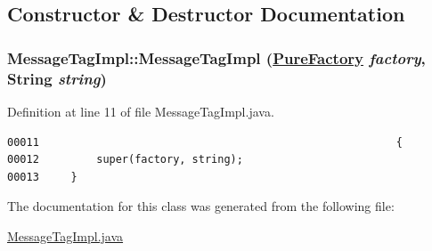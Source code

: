 \subsection{Constructor \& Destructor Documentation}
\hypertarget{classMessageTagImpl_c0}{
\subsubsection[MessageTagImpl]{\setlength{\rightskip}{0pt plus 5cm}Message\-Tag\-Impl::Message\-Tag\-Impl (\hyperlink{classPureFactory}{Pure\-Factory} {\em factory}, String {\em string})}}
\label{classMessageTagImpl_c0}




Definition at line 11 of file Message\-Tag\-Impl.java.\footnotesize\begin{verbatim}00011                                                        {
00012         super(factory, string);
00013     }
\end{verbatim}\normalsize 


The documentation for this class was generated from the following file:\begin{CompactItemize}
\item 
\hyperlink{MessageTagImpl_8java-source}{Message\-Tag\-Impl.java}\end{CompactItemize}
